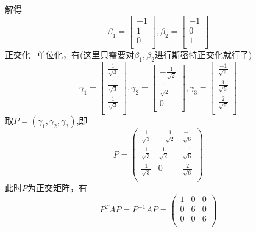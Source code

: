 \documentclass[lang=cn,10pt]{elegantbook}
\begin{document}
\begin{solution}
	解得
	\begin{equation*}
\beta_{1}=\left[ \begin{array}{c}
				-1\\
				1\\
				0\\
			\end{array} \right],
\beta_{2}=\left[ \begin{array}{c}
	-1\\
	0\\
	1\\
\end{array} \right]
	\end{equation*}
	正交化+单位化，有(这里只需要对$\beta_{1},\beta_{2}$进行斯密特正交化就行了)
	\begin{equation*}
		\gamma_{1}=\left[ \begin{array}{c}
			\frac{1}{\sqrt{3}}\\
			\frac{1}{\sqrt{3}}\\
			\frac{1}{\sqrt{3}}\\
		\end{array} \right],
		\gamma_{2}=\left[ \begin{array}{c}
			-\frac{1}{\sqrt{2}}\\
			\frac{1}{\sqrt{2}}\\
			0\\
		\end{array} \right],
		\gamma_{3}=\left[ \begin{array}{c}
			\frac{-1}{\sqrt{6}}\\
			\frac{1}{\sqrt{6}}\\
			\frac{2}{\sqrt{6}}\\
		\end{array} \right]
	\end{equation*}
	取$P=(\gamma_{1},\gamma_{2},\gamma_{3})$,即
	\begin{equation*}
		P=\left( \begin{matrix}
			\frac{1}{\sqrt{3}}&		-\frac{1}{\sqrt{2}}&		\frac{-1}{\sqrt{6}}\\
			\frac{1}{\sqrt{3}}&		\frac{1}{\sqrt{2}}&		\frac{-1}{\sqrt{6}}\\
			\frac{1}{\sqrt{3}}&		0&		\frac{2}{\sqrt{6}}\\
		\end{matrix} \right) 
	\end{equation*}
	此时$P$为正交矩阵，有
	\begin{equation*}
		P^{T}AP=P^{-1}AP=\left( \begin{matrix}
			1&		0&		0\\
			0&		6&		0\\
			0&		0&		6\\
		\end{matrix} \right) 
	\end{equation*}
	

\end{solution}
\end{document}
